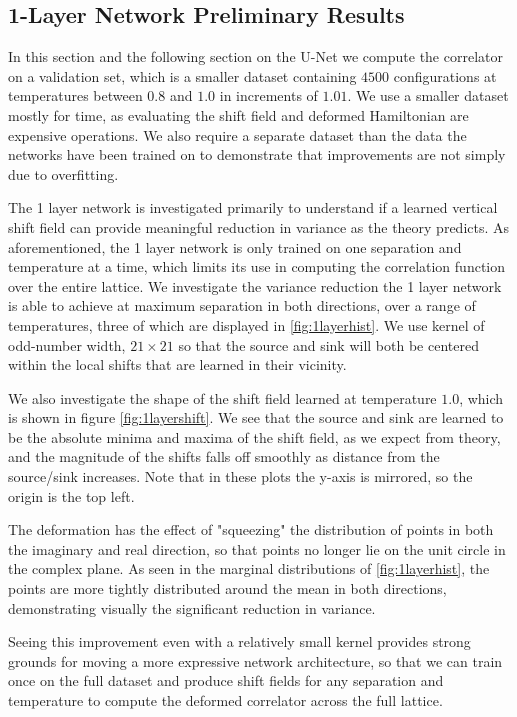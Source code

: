 \documentclass[12pt]{article}
\begin{document}
\subsection{1-Layer Network Preliminary Results}

In this section and the following section on the U-Net we compute the correlator on a validation set, which is a smaller dataset containing $4500$ configurations at temperatures
between $0.8$ and $1.0$ in increments of $1.01$. We use a smaller dataset mostly for time, as evaluating the shift field and deformed Hamiltonian are expensive
operations. We also require a separate dataset than the data the networks have been trained on to demonstrate that improvements are not simply due to overfitting.

The 1 layer network is investigated primarily to understand if a learned vertical shift field can provide meaningful reduction in variance as the theory predicts.
As aforementioned, the 1 layer network is only trained on one separation and temperature at a time, which limits its use in computing the correlation function
over the entire lattice. We investigate the variance reduction the 1 layer network is able to achieve at maximum separation in both directions, over a range of temperatures,
three of which are displayed in \ref{fig:1layerhist}. We use kernel of odd-number width, $21\times21$ so that the source and sink will both be centered 
within the local shifts that are learned in their vicinity. 

We also investigate the shape of the shift field learned at temperature $1.0$, which is shown in figure \ref{fig:1layershift}. We see that the source and sink
are learned to be the absolute minima and maxima of the shift field, as we expect from theory, and the magnitude of the shifts falls off smoothly
as distance from the source/sink increases. Note that in these plots the y-axis is mirrored, so the origin is the top left.

The deformation has the effect of "squeezing" the distribution of points in both the imaginary and real direction, so that points no longer lie on the unit 
circle in the complex plane. As seen in the marginal distributions of \ref{fig:1layerhist}, the points are more tightly distributed around the mean in 
both directions, demonstrating visually the significant reduction in variance.

Seeing this improvement even with a relatively small kernel provides strong grounds for moving a more expressive network architecture, so that we can train once
on the full dataset and produce shift fields for any separation and temperature to compute the deformed correlator across the full lattice.
\end{document}
